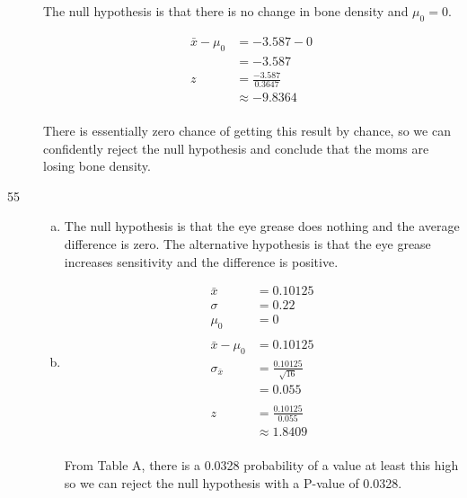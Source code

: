 \documentclass[letterpaper, landscape]{exam}
\begin{document}
\begin{description}
        The null hypothesis is that there is no change in bone density and
        $\mu_0 = 0$.

        \begin{align*}
          \bar{x} - \mu_0 & = -3.587 - 0 \\
                          & = -3.587 \\
          z & = \frac{-3.587}{0.3647} \\
            & \approx -9.8364 \\
        \end{align*}

        There is essentially zero chance of getting this result by chance,
        so we can confidently reject the null hypothesis and conclude that
        the moms are losing bone density.

      \item[55]
        \begin{enumerate}[(a)]
          \item The null hypothesis is that the eye grease does nothing and the
            average difference is zero. The alternative hypothesis is that the
            eye grease increases sensitivity and the difference is positive.

          \item
            \begin{align*}
              \bar{x} & = 0.10125 \\
              \sigma  & = 0.22 \\
              \mu_0   & = 0 \\
              \\
              \bar{x} - \mu_0  & = 0.10125 \\
              \sigma_{\bar{x}} & = \frac{0.10125}{\sqrt{16}} \\
                               & = 0.055 \\
              \\
              z & = \frac{0.10125}{0.055} \\
                & \approx 1.8409 \\
            \end{align*}

            From Table A, there is a 0.0328 probability of a value at least this
            high so we can reject the null hypothesis with a P-value of 0.0328.

        \end{enumerate}


\end{description}
\end{document}
